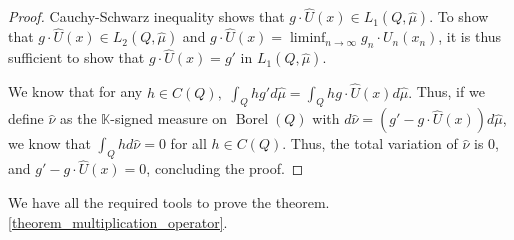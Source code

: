 \documentclass[10pt,a4paper]{amsart}
\def \Borel{\operatorname{Borel}}
\def \HMU{\hat{\mu}}
\def \HU{\hat{U}}
\begin{document}
\begin{proof}
	Cauchy-Schwarz inequality shows that $g\cdot \HU(x)\in L_1(Q,\HMU).$ To show that $g\cdot \HU(x)\in L_2(Q,\HMU)$ and $g\cdot \HU(x)=\liminf_{n\rightarrow\infty} g_n\cdot U_n(x_n)$, it is thus sufficient to show that $g\cdot \HU(x)=g'$ in $L_1(Q,\HMU).$
	
	We know that for any $h\in C(Q),$ $\int_{Q}hg'd\HMU=\int_{Q}hg\cdot\HU(x)d\HMU.$ Thus, if we define $\hat{\nu}$ as the $\mathbb{K}$-signed measure on $\Borel(Q)$ with $d\hat{\nu}=(g'-g\cdot\HU(x))d\HMU$, we know that $\int_{Q}h d\hat{\nu}=0$ for all $h\in C(Q).$ Thus, the total variation of $\hat{\nu}$ is $0$, and $g'-g\cdot\HU(x)=0$, concluding the proof.
\end{proof}

We have  all the required tools to prove the theorem. \ref{theorem_multiplication_operator}. 
\end{document}
